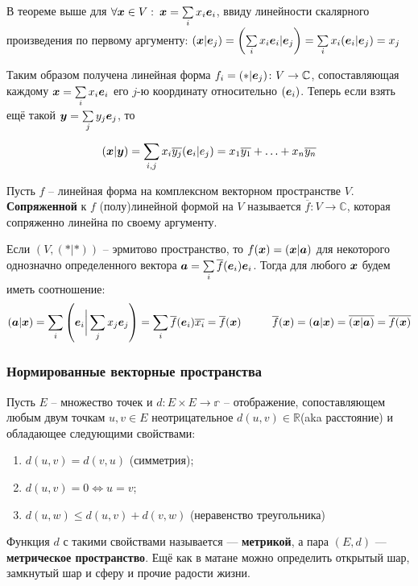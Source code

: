 В теореме выше для $\forall \mbox{\boldmath $x$} \in V: \: \mbox{\boldmath $x$} = \sum\limits_{ i }^{   } x_i \mbox{\boldmath $e$}_i$, ввиду линейности скалярного произведения по первому аргументу: $(\mbox{\boldmath $x$}|\mbox{\boldmath $e$}_j) = \left(\sum\limits_{ i }^{   } x_i \mbox{\boldmath $e$}_i|\mbox{\boldmath $e$}_j\right) = \sum\limits_{ i }^{   } x_i(\mbox{\boldmath $e$}_i|\mbox{\boldmath $e$}_j) = x_j$

Таким образом получена линейная форма $f_i = (*|\mbox{\boldmath $e$}_j) \colon V \to \mathbb{C}$, сопоставляющая каждому $\mbox{\boldmath $x$} = \sum\limits_{ i }^{   } x_i \mbox{\boldmath $e$}_i$ его $j$-ю координату относительно $(\mbox{\boldmath $e$}_i)$.
Теперь если взять ещё такой $\mbox{\boldmath $y$} = \sum\limits_{ j }^{   } y_j \mbox{\boldmath $e$}_j$, то
$$
(\mbox{\boldmath $x$}|\mbox{\boldmath $y$}) = \sum\limits_{ i,j }^{   } x_i \overline{y_j} (\mbox{\boldmath $e$}_i|e_j) = x_1 \overline{y_1} + \ldots + x_n \overline{y_n}
$$
\begin{to_def} 
	 Пусть $f$ -- линейная форма на комплексном векторном пространстве $V$. \textbf{Сопряженной} к $f$ (полу)линейной формой на $V$ называется $\overline{f}\colon V \to \mathbb{C}$, которая сопряженно линейна по своему аргументу.
\end{to_def}

Если $(V,(*|*))$ -- эрмитово пространство, то $f(\mbox{\boldmath $x$}) = (\mbox{\boldmath $x$}|\mbox{\boldmath $a$})$ для некоторого однозначно определенного вектора $\mbox{\boldmath $a$} = \sum\limits_{ i }^{ } \overline{f}(\mbox{\boldmath $e$}_i) \mbox{\boldmath $e$}_i$. Тогда для любого $\mbox{\boldmath $x$}$ будем иметь соотношение:
$$
(\mbox{\boldmath $a$}|\mbox{\boldmath $x$}) = \sum\limits_{ i }^{   } \left(\mbox{\boldmath $e$}_i \bigg| \sum\limits_{ j }^{   } x_j \mbox{\boldmath $e$}_j\right) = \sum\limits_{ i }^{   } \overline{f}(\mbox{\boldmath $e$}_i) \overline{x_i} = \overline{f}(\mbox{\boldmath $x$})
\hspace{1cm}
\overline{f}(\mbox{\boldmath $x$}) = (\mbox{\boldmath $a$}|\mbox{\boldmath $x$}) = \overline{(\mbox{\boldmath $x$}|\mbox{\boldmath $a$})} =	\overline{f(\mbox{\boldmath $x$})}
$$

\subsubsection{Нормированные векторные пространства}
\begin{to_def} 
	Пусть $E$ -- множество точек и $d\colon E \times E \to \mathbb{r}$ -- отображение, сопоставляющем любым двум точкам $u,v \in E$ неотрицательное $d(u,v) \in \mathbb{R}$(aka расстояние) и обладающее следующими свойствами:

	\begin{enumerate}[label = \roman*)]
		\item $d (u,v) = d(v,u)$ (симметрия);
		
		\item $d(u,v) = 0 \Longleftrightarrow u = v$;
		
		\item $d(u,w) \leq d(u,v) + d(v,w)$ (неравенство треугольника) 
	\end{enumerate}

	Функция $d$ с такими свойствами называется --- \textbf{метрикой}, а пара $(E,d)$ --- \textbf{метрическое пространство}.
	Ещё как в матане можно определить открытый шар, замкнутый шар и сферу и прочие радости жизни.
\end{to_def}


